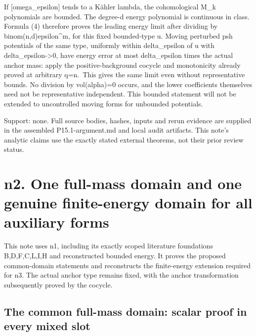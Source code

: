 \documentclass[
]{article}
\begin{document}
If {[}omega\_epsilon{]} tends to a Kähler lambda, the cohomological M\_k
polynomials are bounded. The degree-d energy polynomial is continuous in
class. Formula (4) therefore proves the leading energy limit after
dividing by binom(n,d)epsilon\^{}m, for this fixed bounded-type u.
Moving perturbed psh potentials of the same type, uniformly within
delta\_epsilon of u with delta\_epsilon-\textgreater0, have energy error
at most delta\_epsilon times the actual anchor mass: apply the
positive-background cocycle and monotonicity already proved at arbitrary
q=n.~This gives the same limit even without representative bounds. No
division by vol(alpha)=0 occurs, and the lower coefficients themselves
need not be representative independent. This bounded statement will not
be extended to uncontrolled moving forms for unbounded potentials.

Support: none. Full source bodies, hashes, inputs and rerun evidence are
supplied in the assembled P15.1-argument.md and local audit artifacts.
This note's analytic claims use the exactly stated external theorems,
not their prior review status.

\section{n2. One full-mass domain and one genuine finite-energy domain
for all auxiliary
forms}\label{n2.-one-full-mass-domain-and-one-genuine-finite-energy-domain-for-all-auxiliary-forms}

This note uses n1, including its exactly scoped literature foundations
B,D,F,C,L,I,H and reconstructed bounded energy. It proves the proposed
common-domain statements and reconstructs the finite-energy extension
required for n3. The actual anchor type remains fixed, with the anchor
transformation subsequently proved by the cocycle.

\subsection{The common full-mass domain: scalar proof in every mixed
slot}\label{the-common-full-mass-domain-scalar-proof-in-every-mixed-slot}
\end{document}

